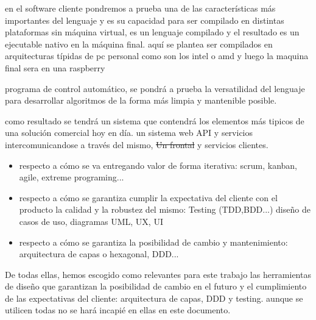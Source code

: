 

en el software cliente pondremos a prueba una de las características más importantes del lenguaje y es su capacidad para ser compilado en distintas plataformas sin máquina virtual, es un lenguaje compilado y el resultado es un ejecutable nativo en la máquina final. aquí se plantea ser compilados en arquitecturas típidas de pc personal como son los intel o amd y luego la maquina final sera en una raspberry 


programa de control automático, se pondrá a prueba la versatilidad del lenguaje para desarrollar algoritmos de la forma más limpia y mantenible posible.


como resultado se tendrá un sistema que contendrá los elementos más tipicos de una solución comercial hoy en día. un sistema web API y servicios intercomunicandose a través del mismo, \sout{Un frontal} y servicios clientes.


\begin{itemize}
	\item respecto a cómo se va entregando valor de forma iterativa: scrum, kanban, agile, extreme programing...
	\item respecto a cómo se garantiza cumplir la expectativa del cliente con el producto la calidad y la robustez del mismo: Testing (TDD,BDD...) diseño de casos de uso, diagramas UML, UX, UI
	\item respecto a cómo se garantiza la posibilidad de cambio y mantenimiento: arquitectura de capas o hexagonal, DDD... 
\end{itemize} 

De todas ellas, hemos escogido como relevantes para este trabajo las herramientas de diseño que garantizan la posibilidad de cambio en el futuro y el cumplimiento de las expectativas del cliente: arquitectura de capas, DDD y testing. aunque se utilicen todas no se hará incapié en ellas en este documento.


